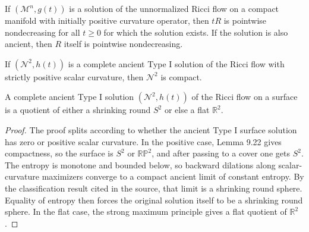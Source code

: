\begin{corollary}
\label{ch09-cor-tR-monotone}

If \((\mathcal M^n,g(t))\) is a solution of the unnormalized Ricci flow on a compact manifold with initially positive curvature operator, then \(tR\) is pointwise nondecreasing for all \(t\ge 0\) for which the solution exists. If the solution is also ancient, then \(R\) itself is pointwise nondecreasing.
\end{corollary}

\begin{lemma}
\label{ch09-lem-ancient-type-i-surface-compact}

If \((\mathcal N^2,h(t))\) is a complete ancient Type I solution of the Ricci flow with strictly positive scalar curvature, then \(\mathcal N^2\) is compact.
\end{lemma}

\begin{proposition}
\label{ch09-prop-type-i-surface-classification}

A complete ancient Type I solution \((\mathcal N^2,h(t))\) of the Ricci flow on a surface is a quotient of either a shrinking round \(S^2\) or else a flat \(\mathbb R^2\).
\end{proposition}

\begin{proof}
\sketch The proof splits according to whether the ancient Type I surface solution has zero or positive scalar curvature. In the positive case, Lemma 9.22 gives compactness, so the surface is \(S^2\) or \(\mathbb{RP}^2\), and after passing to a cover one gets \(S^2\). The entropy is monotone and bounded below, so backward dilations along scalar-curvature maximizers converge to a compact ancient limit of constant entropy. By the classification result cited in the source, that limit is a shrinking round sphere. Equality of entropy then forces the original solution itself to be a shrinking round sphere. In the flat case, the strong maximum principle gives a flat quotient of \(\mathbb R^2\).
\end{proof}

